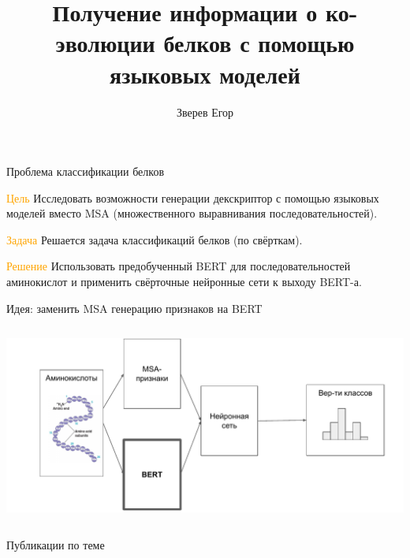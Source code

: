 \documentclass{beamer}
\title[\hbox to 56mm{Learning co-evolution information}]{Получение информации о ко-эволюции белков с помощью языковых моделей}
\author[Е.\,О. Зверев]{Зверев Егор}
\institute{Московский физико-технический институт}
\date{\footnotesize
\par\smallskip\emph{Курс:} Автоматизация научных исследований\par (практика, В.\,В.~Стрижов)/Группа 821
\par\smallskip\emph{Эксперт:} Сергей Грудинин
\par\smallskip\emph{Консультант:} Илья Игашов
\par\bigskip\small 2021}
\begin{document}
\begin{frame}
\thispagestyle{empty}
\maketitle
\end{frame}
\begin{frame}{Проблема классификации белков}
\begin{block}{\textcolor{orange}{Цель}}
Исследовать возможности генерации декскриптор с помощью языковых моделей вместо MSA (множественного выравнивания последовательностей). \end{block}
\begin{block}{\textcolor{orange}{Задача}}
Решается задача классификаций белков (по свёрткам). 
\end{block}
\begin{block} {\textcolor{orange}{Решение}}
Использовать предобученный BERT для  последовательностей аминокислот и применить свёрточные нейронные сети к выходу BERT-а.
\end{block}

\end{frame}
\begin{frame}{Идея: {\color{orange}заменить MSA генерацию признаков на BERT}}



\begin{columns}[c]
\includegraphics[width=1.1\textwidth]{figures/figure9RUS.pdf}
\end{columns}

\bigskip

\end{frame}
\begin{frame}{Публикации по теме}
\nocite{*}


\end{frame}
\end{document}
